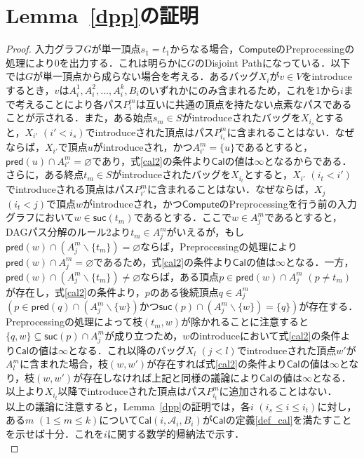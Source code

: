 \documentclass[master]{kuisthesis}		%
\theoremstyle{plain}
\theoremstyle{definition}
\begin{document}
{\section{Lemma~\ref{dpp}の証明}

\begin{proof}
    入力グラフ$G$が単一頂点$s_1=t_1$からなる場合，$\mathsf{Compute}$のPreprocessingの処理により0を出力する．これは明らかに$G$のDisjoint Pathになっている．以下では$G$が単一頂点から成らない場合を考える．あるバッグ$X_i$が$v \in V$をintroduceするとき，$v$は$A^1_i, A^2_i,  \dots, A^k_i, B_i$のいずれかにのみ含まれるため，これを1から$i$まで考えることにより各パス$P^m_i$は互いに共通の頂点を持たない点素なパスであることが示される．また，ある始点$s_m \in S$がintroduceされたバッグを$X_{i_s}$とすると，$X_{i'}$ $(i' < i_s)$でintroduceされた頂点はパス$P^m_{i_s}$に含まれることはない．なぜならば，$X_{i'}$で頂点$u$がintroduceされ，かつ$A^m_{i'} = \{u\}$であるとすると，$\mathsf{pred}(u) \cap A^m_{i'} = \varnothing$であり，式\ref{cal2}の条件より$\mathsf{Cal}$の値は$\infty$となるからである．さらに，ある終点$t_m \in S$がintroduceされたバッグを$X_{i_t}$とすると，$X_{i'}$ $(i_t < i')$でintroduceされる頂点はパス$P^m_{i'}$に含まれることはない．なぜならば，$X_j$ $(i_t < j)$で頂点$w$がintroduceされ，かつ$\mathsf{Compute}$のPreprocessingを行う前の入力グラフにおいて$w \in \mathsf{suc}(t_m)$であるとする．ここで$w \in A^m_j$であるとすると，DAGパス分解のルール2より$t_m \in A^m_j$がいえるが，もし$\mathsf{pred}(w) \cap (A^m_j \backslash \{t_m\}) = \varnothing$ならば，Preprocessingの処理により$\mathsf{pred}(w) \cap A^m_j = \varnothing$であるため，式\ref{cal2}の条件より$\mathsf{Cal}$の値は$\infty$となる．一方，$\mathsf{pred}(w) \cap (A^m_j \backslash \{t_m\}) \neq \varnothing$ならば，ある頂点$p \in \mathsf{pred}(w) \cap A^m_j$ $(p \neq t_m)$が存在し，式\ref{cal2}の条件より，$p$のある後続頂点$q \in A^m_j$ $(p \in \mathsf{pred}(q) \cap (A^m_j \backslash \{w\}) \text{かつ} \mathsf{suc}(p) \cap (A^m_j \backslash \{w\}) = \{q\})$が存在する．Preprocessingの処理によって枝$(t_m, w)$が除かれることに注意すると$\{q, w\} \subseteq \mathsf{suc}(p) \cap A^m_j$が成り立つため，$w$のintroduceにおいて式\ref{cal2}の条件より$\mathsf{Cal}$の値は$\infty$となる．これ以降のバッグ$X_l$ $(j < l)$でintroduceされた頂点$w'$が$A^m_l$に含まれた場合，枝$(w, w')$が存在すれば式\ref{cal2}の条件より$\mathsf{Cal}$の値は$\infty$となり，枝$(w, w')$が存在しなければ上記と同様の議論により$\mathsf{Cal}$の値は$\infty$となる．以上より$X_{i_t}$以降でintroduceされた頂点はパス$P^m_{i_t}$に追加されることはない．\\
    以上の議論に注意すると，Lemma~\ref{dpp}の証明では，各$i$ $(i_s \leq i \leq i_t)$に対し，ある$m$ $(1 \leq m \leq k)$について$\mathsf{Cal}(i, \mathscr{A}_i, B_i)$が$\mathsf{Cal}$の定義\ref{def_cal}を満たすことを示せば十分．これを$i$に関する数学的帰納法で示す．\\

\end{proof}}
\end{document}
